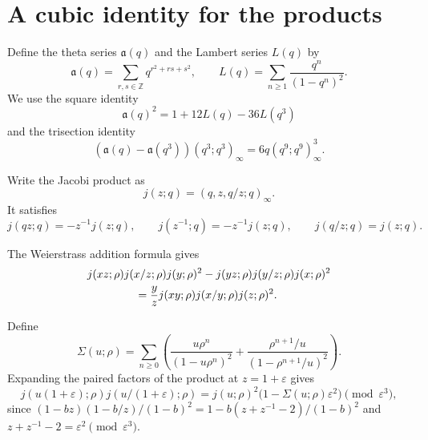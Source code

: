 \documentclass[11pt]{article}
\numberwithin{equation}{section}
\theoremstyle{remark}
\begin{document}
\section{A cubic identity for the products}\label{sec:product}

Define the theta series \(\mathfrak a(q)\) and the Lambert series \(L(q)\) by
\[
 \mathfrak a(q)=\sum_{r,s\in\mathbb Z}q^{r^2+rs+s^2},\qquad
 L(q)=\sum_{n\ge1}\frac{q^n}{(1-q^n)^2}.
\]
We use the square identity \cite[Theorem 7.2]{Matsuda2020}
\begin{equation}\label{eq:formal-square}
 \mathfrak a(q)^2=1+12L(q)-36L(q^3)
\end{equation}
and the trisection identity \cite[equation (2.4), with $q$ replaced by $q^3$]{BorweinBorweinGarvan1994}
\begin{equation}\label{eq:formal-trisection}
 (\mathfrak a(q)-\mathfrak a(q^3))(q^3;q^3)_\infty
 =6q(q^9;q^9)_\infty^3.
\end{equation}

Write the Jacobi product as
\begin{equation}\label{eq:formal-jacobi}
 j(z;q)=(q,z,q/z;q)_\infty.
\end{equation}
It satisfies
\begin{equation}\label{eq:formal-jacobi-shifts}
 j(qz;q)=-z^{-1}j(z;q),\qquad
 j(z^{-1};q)=-z^{-1}j(z;q),\qquad j(q/z;q)=j(z;q).
\end{equation}

The Weierstrass addition formula gives
\begin{equation}\label{eq:formal-addition}
 \begin{aligned}
 &j(xz;\rho)j(x/z;\rho)j(y;\rho)^2
 -j(yz;\rho)j(y/z;\rho)j(x;\rho)^2\\
 &\hspace{15mm}=\frac yz j(xy;\rho)j(x/y;\rho)j(z;\rho)^2.
 \end{aligned}
\end{equation}

Define
\[
 \Sigma(u;\rho)=\sum_{n\ge0}\left(
 \frac{u\rho^n}{(1-u\rho^n)^2}
 +\frac{\rho^{n+1}/u}{(1-\rho^{n+1}/u)^2}\right).
\]
Expanding the paired factors of the product at $z=1+\varepsilon$ gives
\begin{equation}\label{eq:formal-kernel}
 j(u(1+\varepsilon);\rho)j(u/(1+\varepsilon);\rho)
 =j(u;\rho)^2\bigl(1-\Sigma(u;\rho)\varepsilon^2\bigr)
 \pmod{\varepsilon^3},
\end{equation}
since $(1-bz)(1-b/z)/(1-b)^2=1-b(z+z^{-1}-2)/(1-b)^2$ and $z+z^{-1}-2=\varepsilon^2\pmod{\varepsilon^3}$.
\end{document}
